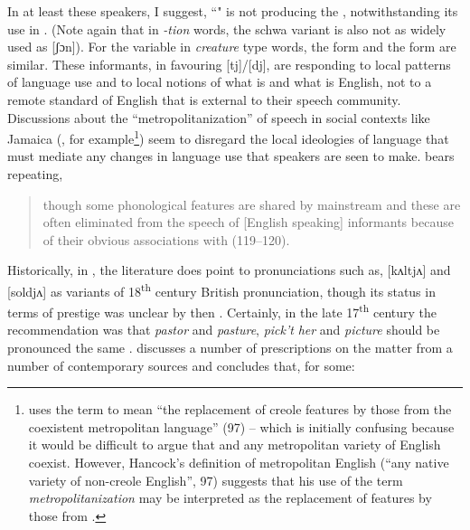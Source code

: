 In at least these speakers, I suggest, ``" is not producing the , notwithstanding its use in .  (Note again that in \textit{-tion} words, the  schwa variant is also not as widely used as [ʃɔn]).  For the variable in \textit{creature} type words, the  form and the  form are similar.  These informants, in favouring [tj]\slash [dj], are responding to local patterns of language use and to local notions of what is  and what is English, not to a remote standard of English that is external to their speech community.    Discussions about the “metropolitanization” of speech in social contexts like Jamaica (\citealt[70]{Trudgill2002}, for example\footnote{\citet{Hancock1994} uses the term to mean “the replacement of creole features by those from the coexistent metropolitan language” (97) – which is initially confusing because it would be difficult to argue that  and any metropolitan variety of English coexist.  However, Hancock’s definition of metropolitan English (“any native variety of non-creole English”, 97) suggests that his use of the term \textit{metropolitanization} may be interpreted as the replacement of  features by those from .}) seem to disregard the local ideologies of language that must mediate any changes in language use that speakers are seen to make.  \citet{Shields1987} bears repeating,

\begin{quote}
though some phonological features are shared by mainstream  and  these are often eliminated from the speech of [English speaking] informants because of their obvious associations with  (119--120).
\end{quote}

Historically, in , the literature does point to pronunciations such as\linebreak\relax [kritjʌ], [kʌltjʌ] and [soldjʌ] as variants of 18\textsuperscript{th} century British pronunciation, though its status in terms of prestige was unclear by then \citep[178]{Lehmann1973}.  Certainly, in the late 17\textsuperscript{th} century the recommendation was that \textit{pastor} and \textit{pasture}, \textit{pick’t} \textit{her} and \textit{picture} should be pronounced the same \citep[365]{Freeborn1998}.  \citet[146]{Beal2002} discusses a number of prescriptions on the matter from a number of contemporary sources and concludes that, for some:

